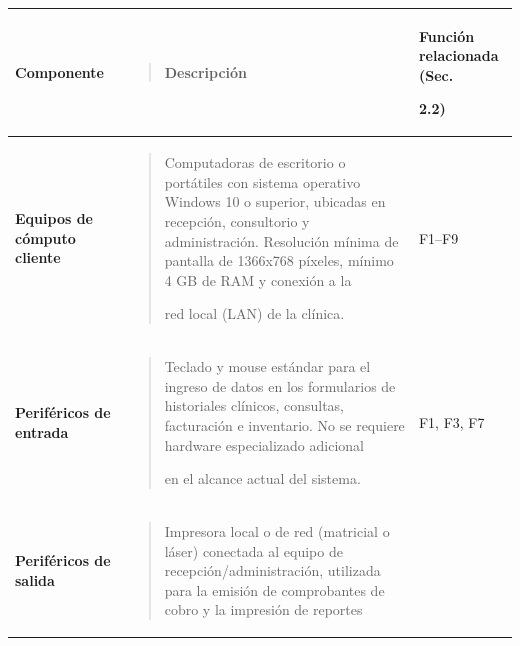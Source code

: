 \documentclass[
]{article}
\newcounter{none} %
\begin{document}
{\def\LTcaptype{none} %
\begin{longtable}[]{@{}
  >{\raggedright\arraybackslash}p{}
  >{\raggedright\arraybackslash}p{}
  >{\raggedright\arraybackslash}p{}@{}}
\toprule\noalign{}
\begin{minipage}[b]{\linewidth}\raggedright
\textbf{Componente}
\end{minipage} & \begin{minipage}[b]{\linewidth}\raggedright
\begin{quote}
\textbf{Descripción}
\end{quote}
\end{minipage} & \begin{minipage}[b]{\linewidth}\raggedright
\textbf{Función relacionada (Sec.}

\textbf{2.2)}
\end{minipage} \\
\midrule\noalign{}
\endhead
\bottomrule\noalign{}
\endlastfoot
\textbf{Equipos de cómputo cliente} &
\begin{minipage}[t]{\linewidth}\raggedright
\begin{quote}
Computadoras de escritorio o portátiles con sistema operativo Windows 10
o superior, ubicadas en recepción, consultorio y administración.
Resolución mínima de pantalla de 1366x768 píxeles, mínimo 4 GB de RAM y
conexión a la

red local (LAN) de la clínica.
\end{quote}
\end{minipage} & F1--F9 \\
\textbf{Periféricos de entrada} &
\begin{minipage}[t]{\linewidth}\raggedright
\begin{quote}
Teclado y mouse estándar para el ingreso de datos en los formularios de
historiales clínicos, consultas, facturación e inventario. No se
requiere hardware especializado adicional

en el alcance actual del sistema.
\end{quote}
\end{minipage} & F1, F3, F7 \\
\textbf{Periféricos de salida} &
\begin{minipage}[t]{\linewidth}\raggedright
\begin{quote}
Impresora local o de red (matricial o láser) conectada al equipo de
recepción/administración, utilizada para la emisión de comprobantes de
cobro y la impresión de reportes


\end{quote}
\end{minipage}
\end{longtable}}
\end{document}
